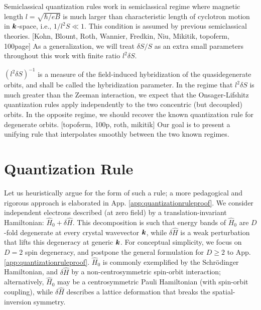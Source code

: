 \documentclass[aps, prb, showpacs, twocolumn, notitlepage, superscriptaddress]{revtex4-1}
\begin{document}
Semiclassical quantization rules work in semiclassical regime where magnetic length $l=\sqrt{\hbar/eB}$ is much larger than characteristic length of cyclotron motion in $\boldsymbol{k}$-space, i.e., $1/l^2 S\ll 1$. This condition is assumed by previous semiclassical theories. [Kohn, Blount, Roth, Wannier, Fredkin, Niu, Mikitik, topoferm, 100page] As a generalization, we will treat $\delta S/S$ as an extra small parameters throughout this work with finite ratio $l^2\delta S$. 

$(l^2\delta S)^{-1}$ is a measure of the field-induced hybridization of the quasidegenerate orbits, and shall be called the hybridization parameter. 
In the regime that $l^2\delta S$ is much greater than the Zeeman interaction, we expect that the Onsager-Lifshitz quantization rules apply independently to the two concentric (but decoupled) orbits. In the opposite regime, we should recover the known quantization rule for degenerate orbits. [topoferm, 100p, roth, mikitik] Our goal is to present a unifying rule that interpolates smoothly between the two known regimes.

\section{Quantization Rule\label{sec:qtznrules}}

Let us heuristically argue for the form of such a rule; a more pedagogical and rigorous approach is elaborated in App. \ref{app:quantizationruleproof}. We consider independent electrons described (at zero field) by a translation-invariant Hamiltonian: $\hat{H}_0{+}\delta \hat{H}$. This decomposition is such that energy bands of $\hat{H}_0$ are $D$-fold degenerate at every crystal wavevector $\boldsymbol{k}$, while $\delta \hat{H}$ is a weak perturbation that lifts this degeneracy at generic $\boldsymbol{k}$. For conceptual simplicity, we focus on $D{=}2$ spin degeneracy, and postpone the general formulation for $D{\geq}2$ to App. \ref{app:quantizationruleproof}.  $\hat{H}_0$ is commonly exemplified by  the Schr\"odinger Hamiltonian, and $\delta \hat{H}$ by a non-centrosymmetric spin-orbit interaction; alternatively, $\hat{H}_0$ may be a centrosymmetric Pauli Hamiltonian (with spin-orbit coupling), while $\delta \hat{H}$ describes a lattice deformation that breaks the spatial-inversion symmetry.
\end{document}
